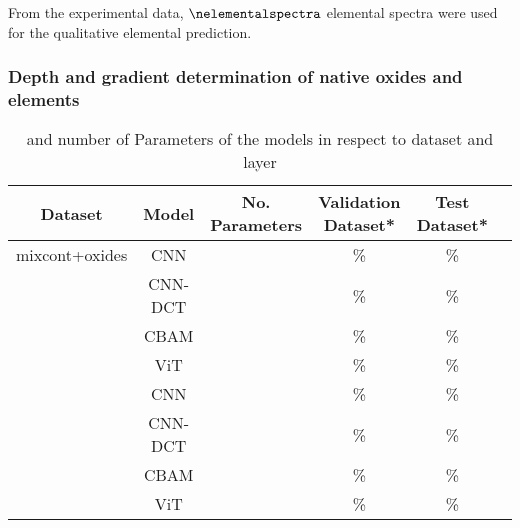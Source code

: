 From the experimental data, $\nelementalspectra$ elemental spectra were used for the qualitative elemental prediction. 

\subsubsection{Depth and gradient determination of native oxides and elements}


\begin{table}[H]
    \centering
    \begin{tabular}{c|c|c|c|c|c}
        Dataset & Model   & No. Parameters & Validation Dataset*  & Test Dataset*    \\
        \hline
        mixcont+oxides& CNN     &                &        \%             &             \% \\
               & CNN-DCT &                &       \%              &             \% \\
               & CBAM    &                &       \%              &             \% \\
               & ViT     &                &       \%              &             \% \\
               & CNN     &                &       \%              &             \%  \\
               & CNN-DCT &                &       \%              &             \%  \\
               & CBAM    &                &       \%              &             \% \\
               & ViT     &                &       \%              &             \% \\
    \end{tabular}
    \caption{ and number of Parameters of the models in respect to dataset and layer}
    \label{tab:acc_depth}
\end{table}
